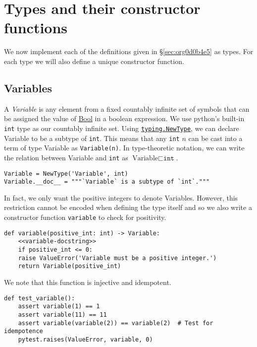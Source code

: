 \documentclass[11pt]{article}
\begin{document}
\section{Types and their constructor functions}
\label{sec:org27c3b34}
We now implement each of the definitions given in \S \ref{sec:org0d0b4e5} as types.  For
each type we will also define a unique constructor function.

\subsection{Variables}
\label{sec:orgdf49146}
A \emph{Variable} is any element from a fixed countably infinite set of symbols that
can be assigned the value of \hyperref[sec:orgc16e7e4]{Bool} in a boolean expression.  We use python's
built-in \texttt{int} type as our countably infinite set.  Using \href{https://docs.python.org/3/library/typing.html\#typing.NewType}{\texttt{typing.NewType}}, we
can declare Variable to be a subtype of \texttt{int}.  This means that any \texttt{int} \(n\)
can be cast into a term of type Variable as \texttt{Variable(n)}. In type-theoretic
notation, we can write the relation between Variable and \texttt{int} as
\(\textrm{Variable} \sqsubset \texttt{int}\).

\begin{verbatim}
Variable = NewType('Variable', int)
Variable.__doc__ = """`Variable` is a subtype of `int`."""
\end{verbatim}

In fact, we only want the positive integers to denote Variables.  However, this
restriction cannot be encoded when defining the type itself and so we also write
a constructor function \texttt{variable} to check for positivity.
\begin{verbatim}
def variable(positive_int: int) -> Variable:
    <<variable-docstring>>
    if positive_int <= 0:
	raise ValueError('Variable must be a positive integer.')
    return Variable(positive_int)
\end{verbatim}


We note that this function is injective and idempotent.
\begin{verbatim}
def test_variable():
    assert variable(1) == 1
    assert variable(11) == 11
    assert variable(variable(2)) == variable(2)  # Test for idempotence
    pytest.raises(ValueError, variable, 0)
\end{verbatim}
\end{document}
